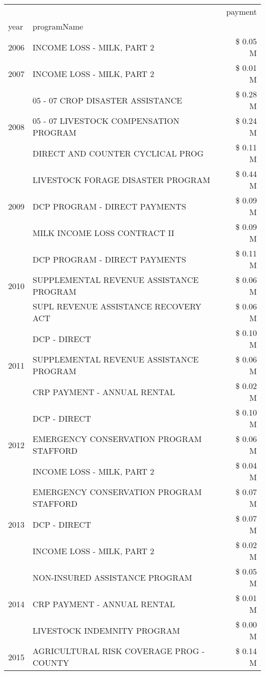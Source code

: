 \begin{tabular}{llr}
\toprule
 &  & payment \\
year & programName &  \\
\midrule
2006 & INCOME LOSS - MILK, PART 2 & \$ 0.05 M \\
\cline{1-3}
2007 & INCOME LOSS - MILK, PART 2 & \$ 0.01 M \\
\cline{1-3}
\multirow[t]{3}{*}{2008} & 05 - 07 CROP DISASTER ASSISTANCE & \$ 0.28 M \\
 & 05 - 07 LIVESTOCK COMPENSATION PROGRAM & \$ 0.24 M \\
 & DIRECT AND COUNTER CYCLICAL PROG & \$ 0.11 M \\
\cline{1-3}
\multirow[t]{3}{*}{2009} & LIVESTOCK FORAGE DISASTER  PROGRAM & \$ 0.44 M \\
 & DCP PROGRAM - DIRECT PAYMENTS & \$ 0.09 M \\
 & MILK INCOME LOSS CONTRACT II & \$ 0.09 M \\
\cline{1-3}
\multirow[t]{3}{*}{2010} & DCP PROGRAM - DIRECT PAYMENTS & \$ 0.11 M \\
 & SUPPLEMENTAL REVENUE ASSISTANCE PROGRAM & \$ 0.06 M \\
 & SUPL REVENUE ASSISTANCE RECOVERY ACT & \$ 0.06 M \\
\cline{1-3}
\multirow[t]{3}{*}{2011} & DCP - DIRECT & \$ 0.10 M \\
 & SUPPLEMENTAL REVENUE ASSISTANCE PROGRAM & \$ 0.06 M \\
 & CRP PAYMENT - ANNUAL RENTAL & \$ 0.02 M \\
\cline{1-3}
\multirow[t]{3}{*}{2012} & DCP - DIRECT & \$ 0.10 M \\
 & EMERGENCY CONSERVATION PROGRAM STAFFORD & \$ 0.06 M \\
 & INCOME LOSS - MILK, PART 2 & \$ 0.04 M \\
\cline{1-3}
\multirow[t]{3}{*}{2013} & EMERGENCY CONSERVATION PROGRAM STAFFORD & \$ 0.07 M \\
 & DCP - DIRECT & \$ 0.07 M \\
 & INCOME LOSS - MILK, PART 2 & \$ 0.02 M \\
\cline{1-3}
\multirow[t]{3}{*}{2014} & NON-INSURED ASSISTANCE PROGRAM & \$ 0.05 M \\
 & CRP PAYMENT - ANNUAL RENTAL & \$ 0.01 M \\
 & LIVESTOCK INDEMNITY PROGRAM & \$ 0.00 M \\
\cline{1-3}
\multirow[t]{3}{*}{2015} & AGRICULTURAL RISK COVERAGE PROG - COUNTY & \$ 0.14 M \\

\end{tabular}
